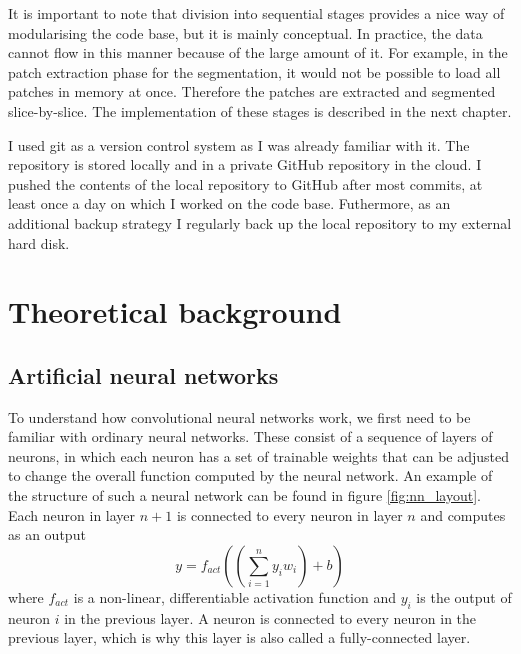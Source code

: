 \documentclass[12pt,a4paper,twoside,openright]{report}
\begin{document}
It is important to note that division into sequential stages provides a nice way of modularising the code base, but it is mainly conceptual. In practice, the data cannot flow in this manner because of the large amount of it. For example, in the patch extraction phase for the segmentation, it would not be possible to load all patches in memory at once. Therefore the patches are extracted and segmented slice-by-slice. The implementation of these stages is described in the next chapter.

I used git as a version control system as I was already familiar with it. The repository is stored locally and in a private GitHub repository in the cloud. I pushed the contents of the local repository to GitHub after most commits, at least once a day on which I worked on the code base. Futhermore, as an additional backup strategy I regularly back up the local repository to my external hard disk.

\section{Theoretical background}
\subsection{Artificial neural networks}
To understand how convolutional neural networks work, we first need to be familiar with ordinary neural networks. These consist of a sequence of layers of neurons, in which each neuron has a set of trainable weights that can be adjusted to change the overall function computed by the neural network. An example of the structure of such a neural network can be found in figure \ref{fig:nn_layout}. Each neuron in layer $n+1$ is connected to every neuron in layer $n$ and computes as an output
\[y = f_{act}((\sum_{i=1}^{n} y_i w_i) + b)\]
where $f_{act}$ is a non-linear, differentiable activation function and $y_i$ is the output of neuron $i$ in the previous layer. A neuron is connected to every neuron in the previous layer, which is why this layer is also called a fully-connected layer.
\end{document}
